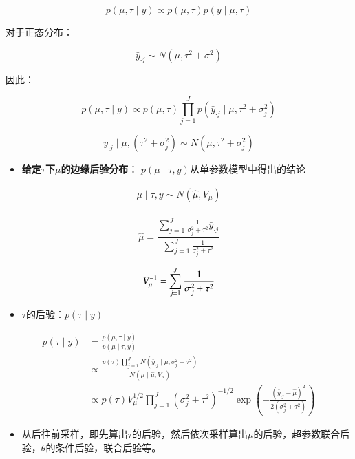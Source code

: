 \[p(\mu, \tau \mid y) \propto p(\mu, \tau) p(y \mid \mu, \tau)\]

对于正态分布：

\[\bar{y}_{\cdot j}\sim N(\mu,\tau^2+\sigma^2)\]

因此：

\[p(\mu, \tau \mid y) \propto p(\mu, \tau) \prod_{j=1}^{J} p\left(\bar{y} _{\cdot j} \mid \mu, \tau^{2}+\sigma_{j}^{2}\right)\]

\[\bar{y}_{\cdot j} \mid \mu, (\tau^{2}+\sigma_{j}^{2}) 
\sim
N \left( \mu, \tau^{2} + \sigma_{j}^{2} \right)\]

\begin{itemize}
\item
  \textbf{给定\(\tau\)下\(\mu\)的边缘后验分布}：
  \(p(\mu \mid \tau, y)\)从单参数模型中得出的结论
\end{itemize}

\begin{equation}
  \begin{array}{c}
    \mu \mid \tau, y \sim N\left(\hat{\mu}, V_{\mu}\right) \\
    \end{array}
\end{equation}


\[\hat{\mu}=\frac{\sum_{j=1}^{J} \frac{1}{\sigma_{j}^{2}+\tau^{2}} \bar{y}_{\cdot j}}{\sum_{j=1}^{J} \frac{1}{\sigma_{j}^{2}+\tau^{2}}}\]

\[\\V_{\mu}^{-1}=\sum_{j=1}^{J} \frac{1}{\sigma_{j}^{2}+\tau^{2}}\]

\begin{itemize}
\item
  \(\tau\)的后验：\(p(\tau \mid y) \)
\end{itemize}

\begin{equation}
  \begin{aligned}
    p(\tau \mid y) 
    &=\frac{p(\mu, \tau \mid y)}{p(\mu \mid \tau, y)} \\
    &\propto 
    \frac{p(\tau) \prod_{j=1}^{J} 
    N\left(\bar{y}_{ \cdot j }\mid \mu, \sigma_{j}^{2}+\tau^{2}\right)}
    {N\left(\mu \mid \hat{\mu}, V_{\mu}\right)} \\
    & \propto p(\tau) V_{\mu}^{1 / 2} 
    \prod_{j=1}^{J}\left(\sigma_{j}^{2}+\tau^{2}\right)^{-1 / 2} 
    \exp \left(
    -\frac{\left(\bar{y}_{\cdot j}-\hat{\mu}\right)^{2}}{2\left(\sigma_{j}^{2}+\tau^{2}\right)}
    \right)
    \end{aligned}
\end{equation}


\begin{itemize}
\item
  从后往前采样，即先算出\(\tau\)的后验，然后依次采样算出\(\mu\)的后验，超参数联合后验，\(\theta\)的条件后验，联合后验等。
\end{itemize}
